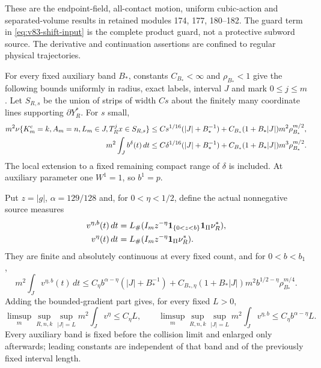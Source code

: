 These are the endpoint-field, all-contact motion, uniform cubic-action
and separated-volume results in retained modules 174, 177, 180--182.
The guard term in \eqref{eq:v83-shift-input} is the complete product
guard, not a protective subword source. The derivative and continuation
assertions are confined to regular physical trajectories.

\begin{inputstatement}
\label{input:v83-local}
For every fixed auxiliary band $B_*$, constants $C_{B_*}<\infty$ and
$\rho_{B_*}<1$ give the following bounds uniformly in radius, exact
labels, interval $J$ and mark $0\le j\le m$. Let $S_{R,s}$ be the
union of strips of width $Cs$ about the finitely many coordinate lines
supporting $\partial Y_R^*$. For $s$ small,
\begin{align}
 m^2\nu\{K_m^{\rm c}=k,A_m=n,L_m\in J,
                       T_R^jx\in S_{R,s}\}
 &\le Cs^{1/16}(|J|+B_*^{-1})
   +C_{B_*}(1+B_*|J|)m^2\rho_{B_*}^{m/2},\label{eq:v83-strip-input}\\
 m^2\int_Jb^\delta(t)\,dt
 &\le C\delta^{1/16}(|J|+B_*^{-1})
   +C_{B_*}(1+B_*|J|)m^3\rho_{B_*}^{m/2}.\label{eq:v83-guard-input}
\end{align}
The local extension to a fixed remaining compact range of $\delta$
is included. At auxiliary parameter one $W^1=1$, so $b^1=p$.

Put $z=|g|$, $\alpha=129/128$ and, for $0<\eta<1/2$, define the
actual nonnegative source measures
\begin{align}
 v^{\eta,b}(t)\,dt&=L_\#(I_m z^{-\eta}\one_{\{0<z<b\}}
                                       \one_\Pi\nu_R^*),\notag\\
 v^\eta(t)\,dt&=L_\#(I_m z^{-\eta}\one_\Pi\nu_R^*).
                                                   \label{eq:v83-fractional-input}
\end{align}
They are finite and absolutely continuous at every fixed count, and
for $0<b<b_1$,
\begin{equation}\label{eq:v83-fractional-finite-input}
 m^2\int_Jv^{\eta,b}(t)\,dt
 \le C_\eta b^{\alpha-\eta}(|J|+B_*^{-1})
  +C_{B_*,\eta}(1+B_*|J|)m^2b^{1/2-\eta}\rho_{B_*}^{m/4}.
\end{equation}
Adding the bounded-gradient part gives, for every fixed $L>0$,
\begin{equation}\label{eq:v83-fixed-width-input}
 \limsup_m\sup_{R,n,k}\sup_{|J|=L}m^2\int_Jv^\eta\le C_\eta L,
 \qquad
 \limsup_m\sup_{R,n,k}\sup_{|J|=L}m^2\int_Jv^{\eta,b}
                                      \le C_\eta b^{\alpha-\eta}L.
\end{equation}
Every auxiliary band is fixed before the collision limit and enlarged
only afterwards; leading constants are independent of that band and
of the previously fixed interval length.
\end{inputstatement}
